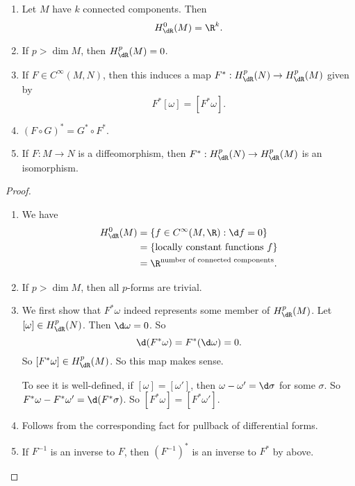 \documentclass[a4paper]{article}
\begin{document}
\begin{prop}\leavevmode
  \begin{enumerate}
    \item Let $M$ have $k$ connected components. Then
      \[
        H_{\dR}^0(M) = \R^k.
      \]
    \item If $p > \dim M$, then $H^p_{\dR}(M) = 0$.
    \item If $F \in C^\infty(M, N)$, then this induces a map $F^*: H^p_\dR(N) \to H^p_\dR(M)$ given by
      \[
        F^*[\omega] = [F^* \omega].
      \]
    \item $(F \circ G)^* = G^* \circ F^*$.
    \item If $F: M \to N$ is a diffeomorphism, then $F^*: H^p_{\dR}(N) \to H^p_{\dR}(M)$ is an isomorphism.
  \end{enumerate}
\end{prop}

\begin{proof}\leavevmode
  \begin{enumerate}
    \item We have
      \begin{align*}
        H_{\dR}^0(M) &= \{f \in C^\infty(M, \R): \d f = 0\} \\
        &= \{\text{locally constant functions $f$}\}\\
        &= \R^{\text{number of connected components}}.
      \end{align*}
    \item If $p > \dim M$, then all $p$-forms are trivial.
    \item We first show that $F^* \omega$ indeed represents some member of $H^p_{\dR}(M)$. Let $[\omega] \in H^p_{\dR}(N)$. Then $\d \omega = 0$. So
      \[
        \d (F^* \omega) = F^*(\d \omega) = 0.
      \]
      So $[F^* \omega] \in H^p_\dR(M)$. So this map makes sense.

      To see it is well-defined, if $[\omega] = [\omega']$, then $\omega - \omega' = \d \sigma$ for some $\sigma$. So $F^* \omega - F^* \omega' = \d (F^* \sigma)$. So $[F^* \omega] = [F^* \omega']$.
    \item Follows from the corresponding fact for pullback of differential forms.
    \item If $F^{-1}$ is an inverse to $F$, then $(F^{-1})^*$ is an inverse to $F^*$ by above.
  \end{enumerate}
\end{proof}
\end{document}
